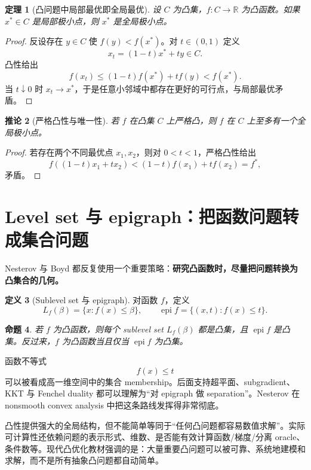 \documentclass[11pt,a4paper,openany]{ctexrep}
\newtheorem{theorem}{定理}[chapter]
\newtheorem{proposition}[theorem]{命题}
\newtheorem{corollary}[theorem]{推论}
\theoremstyle{definition}
\newtheorem{definition}[theorem]{定义}
\newcommand{\R}{\mathbb{R}}
\newcommand{\epi}{\operatorname{epi}}
\begin{document}
\begin{theorem}[凸问题中局部最优即全局最优]
设 $C$ 为凸集，$f:C\to\R$ 为凸函数。如果 $x^*\in C$ 是局部极小点，则 $x^*$ 是全局极小点。
\end{theorem}
\begin{proof}
反设存在 $y\in C$ 使 $f(y)<f(x^*)$。对 $t\in(0,1)$ 定义
\[
 x_t=(1-t)x^*+ty\in C.
\]
凸性给出
\[
 f(x_t)\le (1-t)f(x^*)+t f(y)<f(x^*).
\]
当 $t\downarrow0$ 时 $x_t\to x^*$，于是任意小邻域中都存在更好的可行点，与局部最优矛盾。
\end{proof}

\begin{corollary}[严格凸性与唯一性]
若 $f$ 在凸集 $C$ 上严格凸，则 $f$ 在 $C$ 上至多有一个全局极小点。
\end{corollary}
\begin{proof}
若存在两个不同最优点 $x_1,x_2$，则对 $0<t<1$，严格凸性给出
\[
f((1-t)x_1+tx_2)<(1-t)f(x_1)+tf(x_2)=f^*,
\]
矛盾。
\end{proof}

\section{Level set 与 epigraph：把函数问题转成集合问题}
Nesterov 与 Boyd 都反复使用一个重要策略：\textbf{研究凸函数时，尽量把问题转换为凸集合的几何。}

\begin{definition}[Sublevel set 与 epigraph]
对函数 $f$，定义
\[
L_f(\beta)=\{x:f(x)\le \beta\},\qquad
\epi f=\{(x,t): f(x)\le t\}.
\]
\end{definition}

\begin{proposition}
若 $f$ 为凸函数，则每个 sublevel set $L_f(\beta)$ 都是凸集，且 $\epi f$ 是凸集。反过来，$f$ 为凸函数当且仅当 $\epi f$ 为凸集。
\end{proposition}

\begin{intuitionbox}
函数不等式
\[
 f(x)\le t
\]
可以被看成高一维空间中的集合 membership。后面支持超平面、subgradient、KKT 与 Fenchel duality 都可以理解为“对 epigraph 做 separation”。Nesterov 在 nonsmooth convex analysis 中把这条路线发挥得非常彻底。\cite[\S3.1]{nesterov}
\end{intuitionbox}

\begin{warningbox}
凸性提供强大的全局结构，但不能简单等同于“任何凸问题都容易数值求解”。实际可计算性还依赖问题的表示形式、维数、是否能有效计算函数/梯度/分离 oracle、条件数等。现代凸优化教材强调的是：大量重要凸问题可以被可靠、系统地建模和求解，而不是所有抽象凸问题都自动简单。\cite[Ch.~1]{boyd}\cite[Lecture~1]{bental}
\end{warningbox}
\end{document}
